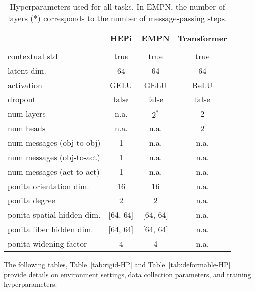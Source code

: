 \begin{table}[ht]
\centering
\caption{Hyperparameters used for all tasks. In EMPN, the number of layers (*) corresponds to the number of message-passing steps.}
\label{tab:model-HP}
\begin{adjustbox}{max width=\textwidth}
\begin{tabular}{lccc}
\toprule
    & \textbf{HEPi} & \textbf{EMPN} & \textbf{Transformer} \\ 
\midrule
\multicolumn{4}{l}{} \\
contextual std                   & true         & true        & true \\
latent dim.                      & 64           & 64          & 64 \\
activation                       & GELU         & GELU        & ReLU \\
dropout                          & false        & false       & false \\
num layers                       & n.a.         & $\text{2}^*$          & 2 \\
num heads                        & n.a.         & n.a.        & 2 \\
num messages (obj-to-obj)        & 1            & n.a.        & n.a. \\
num messages (obj-to-act)        & 1            & n.a.        & n.a. \\
num messages (act-to-act)        & 1            & n.a.        & n.a. \\
ponita orientation dim.          & 16           & 16          & n.a. \\
ponita degree                    & 2            & 2           & n.a. \\
ponita spatial hidden dim.       & [64, 64]     & [64, 64]    & n.a. \\
ponita fiber hidden dim.         & [64, 64]     & [64, 64]    & n.a. \\
ponita widening factor           & 4            & 4           & n.a. \\ 
\bottomrule
\end{tabular}
\end{adjustbox}
\end{table}


The following tables, Table~\ref{tab:rigid-HP} and Table~\ref{tab:deformable-HP} provide details on environment settings, data collection parameters, and training hyperparameters.

